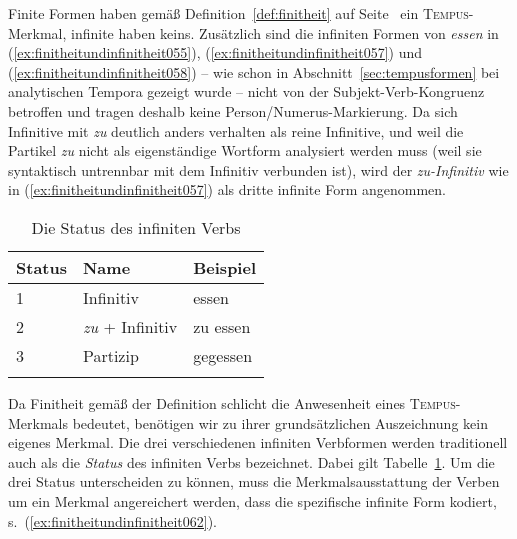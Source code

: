 \begin{exe}
  \ex\label{ex:finitheitundinfinitheit054}
  \begin{xlist}
  \end{xlist}
  \ex\label{ex:finitheitundinfinitheit058}
  \begin{xlist}
  \end{xlist}
\end{exe}

Finite Formen haben gemäß Definition~\ref{def:finitheit} auf Seite~\pageref{def:finitheit} ein \textsc{Tempus}-Merkmal, infinite haben keins.
Zusätzlich sind die infiniten Formen von \textit{essen} in (\ref{ex:finitheitundinfinitheit055}), (\ref{ex:finitheitundinfinitheit057}) und (\ref{ex:finitheitundinfinitheit058}) -- wie schon in Abschnitt~\ref{sec:tempusformen} bei analytischen Tempora gezeigt wurde -- nicht von der Subjekt-Verb-Kongruenz betroffen und tragen deshalb keine Person\slash Numerus-Markierung.
Da sich Infinitive mit \textit{zu} deutlich anders verhalten als reine Infinitive, und weil die Partikel \textit{zu} nicht als eigenständige Wortform analysiert werden muss (weil sie syntaktisch untrennbar mit dem Infinitiv verbunden ist), wird der \textit{zu-Infinitiv} wie in (\ref{ex:finitheitundinfinitheit057}) als dritte infinite Form angenommen.

\begin{table}[!htbp]
  \centering
  \begin{tabular}{lll}
    \lsptoprule
    \textbf{Status} & \textbf{Name} & \textbf{Beispiel} \\
    \midrule
    1 & Infinitiv & essen \\
    2 & \textit{zu} + Infinitiv & zu essen \\
    3 & Partizip & gegessen \\
    \lspbottomrule
  \end{tabular}
  \caption{Die Status des infiniten Verbs}
  \label{tab:finitheitundinfinitheit061}
\end{table}

Da Finitheit gemäß der Definition schlicht die Anwesenheit eines \textsc{Tempus}-\-Merk\-mals bedeutet, benötigen wir zu ihrer grundsätzlichen Auszeichnung kein eigenes Merkmal.
Die drei verschiedenen infiniten Verbformen werden traditionell auch als die \textit{Status} des infiniten Verbs bezeichnet.
Dabei gilt Tabelle~\ref{tab:finitheitundinfinitheit061}.
Um die drei Status unterscheiden zu können, muss die Merkmalsausstattung der Verben um ein Merkmal angereichert werden, dass die spezifische infinite Form kodiert, s.\ (\ref{ex:finitheitundinfinitheit062}).

